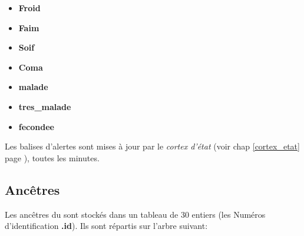 \documentclass[french]{report}
\newlength{\du}\fi
\begin{document}
\begin{itemize}
	\item \textbf{Froid}
	\item \textbf{Faim}
	\item \textbf{Soif}
	\item \textbf{Coma}
	\item \textbf{malade}
	\item \textbf{tres\_malade}
	\item \textbf{fecondee} \\
\end{itemize}

Les balises d'alertes sont mises à jour par le \textit{cortex d'état} (voir chap \ref{cortex_etat} page \pageref{cortex_etat}), toutes les minutes.\\

\subsection{Ancêtres}
Les ancêtres du \CoCiX sont stockés dans un tableau de 30 entiers (les Numéros d'identification \textbf{.id}). Ils sont répartis sur l'arbre suivant:
\end{document}
